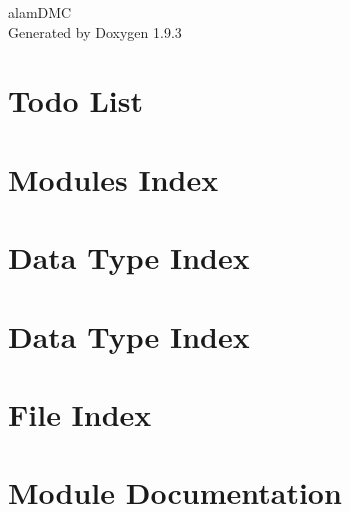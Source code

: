 \documentclass[twoside]{book}
\newcommand{\+}{\discretionary{\mbox{\scriptsize$\hookleftarrow$}}{}{}}
\newcommand{\clearemptydoublepage}{%
    \newpage{\pagestyle{empty}\cleardoublepage}%
  }
\begin{document}
  \raggedbottom
    \hypersetup{pageanchor=false,
                bookmarksnumbered=true,
                pdfencoding=unicode
               }
  \begin{titlepage}
  \vspace*{7cm}
  \begin{center}%
  {\Large alam\+DMC}\\
  \vspace*{1cm}
  {\large Generated by Doxygen 1.9.3}\\
  \end{center}
  \end{titlepage}
  \clearemptydoublepage
  \tableofcontents
  \clearemptydoublepage
  \hypersetup{pageanchor=true}
\chapter{Todo List}
\label{todo}

\chapter{Modules Index}

\chapter{Data Type Index}

\chapter{Data Type Index}

\chapter{File Index}

\chapter{Module Documentation}




























\end{document}
